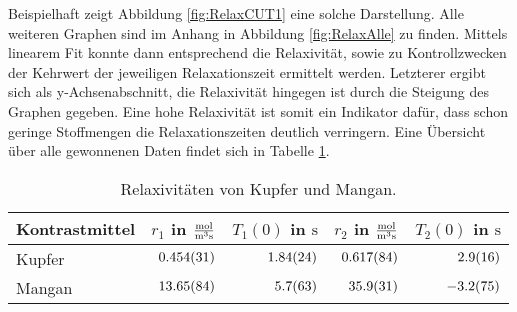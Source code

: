 Beispielhaft zeigt Abbildung \ref{fig:RelaxCUT1} eine solche Darstellung.
Alle weiteren Graphen sind im Anhang in Abbildung \ref{fig:RelaxAlle} zu finden.
Mittels linearem Fit konnte dann entsprechend die Relaxivität, sowie zu Kontrollzwecken der Kehrwert der jeweiligen Relaxationszeit ermittelt werden.
Letzterer ergibt sich als y-Achsenabschnitt, die Relaxivität hingegen ist durch die Steigung des Graphen gegeben.
Eine hohe Relaxivität ist somit ein Indikator dafür, dass schon geringe Stoffmengen die Relaxationszeiten deutlich verringern.
Eine Übersicht über alle gewonnenen Daten findet sich in Tabelle \ref{tab:Relaxivitat}.

\begin{table}[H]
    \centering
    \caption{Relaxivitäten von Kupfer und Mangan.}
    \begin{tabular}{|l||r|r|r|r|} \hline
        Kontrastmittel & $r_{1}$ in $\si{\frac{\mol}{\metre \cubed \second}}$    &  $T_{1}(0)$ in $\si{\second}$ & $r_{2}$ in $\si{\frac{\mol}{\metre \cubed \second}}$ & $T_{2}(0)$ in $\si{\second}$  \\ \hline \hline
        Kupfer & $\SI{0.454 \pm 0.031}{}$   & $\SI{1.84 \pm 0.24}{}$    & $\SI{0.617 \pm 0.084}{}$   & $\SI{2.9  \pm 1.6}{}$ \\ \hline
        Mangan & $\SI{13.65 \pm 0.84}{}$    & $\SI{5.7 \pm 6.3}{}$      & $\SI{35.9 \pm 3.1}{}$  & $\SI{-3.2 \pm 7.5}{}$ \\ \hline
    \end{tabular} 
    \label{tab:Relaxivitat} 
\end{table}

